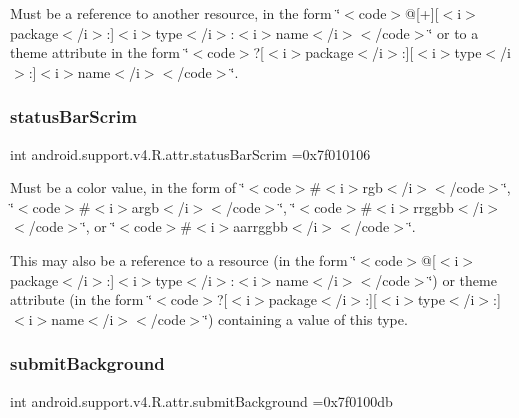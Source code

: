Must be a reference to another resource, in the form \char`\"{}$<$code$>$@\mbox{[}+\mbox{]}\mbox{[}$<$i$>$package$<$/i$>$\+:\mbox{]}$<$i$>$type$<$/i$>$\+:$<$i$>$name$<$/i$>$$<$/code$>$\char`\"{} or to a theme attribute in the form \char`\"{}$<$code$>$?\mbox{[}$<$i$>$package$<$/i$>$\+:\mbox{]}\mbox{[}$<$i$>$type$<$/i$>$\+:\mbox{]}$<$i$>$name$<$/i$>$$<$/code$>$\char`\"{}. \mbox{\label{classandroid_1_1support_1_1v4_1_1R_1_1attr_aed3472edce6d14c66adbc8ad231aecff}} 
\subsubsection{\texorpdfstring{status\+Bar\+Scrim}{statusBarScrim}}
{\footnotesize\ttfamily int android.\+support.\+v4.\+R.\+attr.\+status\+Bar\+Scrim =0x7f010106\hspace{0.3cm}{\ttfamily [static]}}

Must be a color value, in the form of \char`\"{}$<$code$>$\#$<$i$>$rgb$<$/i$>$$<$/code$>$\char`\"{}, \char`\"{}$<$code$>$\#$<$i$>$argb$<$/i$>$$<$/code$>$\char`\"{}, \char`\"{}$<$code$>$\#$<$i$>$rrggbb$<$/i$>$$<$/code$>$\char`\"{}, or \char`\"{}$<$code$>$\#$<$i$>$aarrggbb$<$/i$>$$<$/code$>$\char`\"{}. 

This may also be a reference to a resource (in the form \char`\"{}$<$code$>$@\mbox{[}$<$i$>$package$<$/i$>$\+:\mbox{]}$<$i$>$type$<$/i$>$\+:$<$i$>$name$<$/i$>$$<$/code$>$\char`\"{}) or theme attribute (in the form \char`\"{}$<$code$>$?\mbox{[}$<$i$>$package$<$/i$>$\+:\mbox{]}\mbox{[}$<$i$>$type$<$/i$>$\+:\mbox{]}$<$i$>$name$<$/i$>$$<$/code$>$\char`\"{}) containing a value of this type. \mbox{\label{classandroid_1_1support_1_1v4_1_1R_1_1attr_a02223c24d2cfe93197a2ab46075d2c1a}} 
\subsubsection{\texorpdfstring{submit\+Background}{submitBackground}}
{\footnotesize\ttfamily int android.\+support.\+v4.\+R.\+attr.\+submit\+Background =0x7f0100db\hspace{0.3cm}{\ttfamily [static]}}

